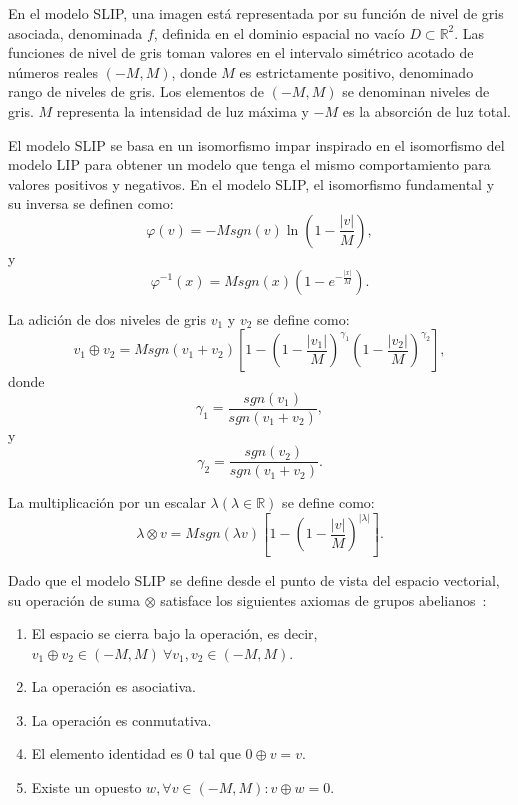 En el modelo SLIP, una imagen está representada por su función de nivel de gris asociada, denominada $f$, definida en el dominio espacial no vacío $D \subset \mathbb{R}^2$. Las funciones de nivel de gris toman valores en el intervalo simétrico acotado de números reales $(-M, M)$, donde $M$ es estrictamente positivo, denominado rango de niveles de gris. Los elementos de $(-M, M )$ se denominan niveles de gris. $M$ representa la intensidad de luz máxima y $-M$ es la absorción de luz total.

El modelo SLIP se basa en un isomorfismo impar inspirado en el isomorfismo del modelo LIP para obtener un modelo que tenga el mismo comportamiento para valores positivos y negativos. En el modelo SLIP, el isomorfismo fundamental y su inversa se definen como:
\begin{equation}
	\varphi(v)=-Msgn(v)\ln\left(1-\frac{|v|}{M}\right),
\end{equation}
y
\begin{equation}
	\varphi^{-1}(x)=Msgn(x)\left(1-e^{-\frac{|x|}{M}}\right).
\end{equation}

La adición de dos niveles de gris $v_1$ y $v_2$ se define como:
\begin{equation}
	v_1\oplus v_2=Msgn(v_1+v_2)\left[1-\left(1-\frac{|v_1|}{M}\right)^{\gamma_1}\left(1-\frac{|v_2|}{M}\right)^{\gamma_2}\right],
\end{equation}
donde
\begin{equation}
	\gamma_1=\frac{sgn(v_1)}{sgn(v_1+v_2)},
\end{equation}
y
\begin{equation}
	\gamma_2=\frac{sgn(v_2)}{sgn(v_1+v_2)}.
\end{equation}

La multiplicación por un escalar $\lambda (\lambda \in \mathbb{R})$ se define como:
\begin{equation}
	\lambda \otimes v = Msgn(\lambda v)\left[1-\left(1-\frac{|v|}{M}\right)^{|\lambda|}\right].
\end{equation}

Dado que el modelo SLIP se define desde el punto de vista del espacio vectorial, su operación de suma $\otimes$ satisface los siguientes axiomas de grupos abelianos~\cite{navarro2013symmetric}:

\begin{enumerate}
	\item El espacio se cierra bajo la operación, es decir, $v_1\oplus v_2 \in (-M, M )~\forall v_1, v_2 \in (-M, M )$.
	\item La operación es asociativa.
	\item La operación es conmutativa.
	\item El elemento identidad es $0$ tal que $0\oplus v = v$.
	\item  Existe un opuesto $w, \forall v \in (-M, M ): v \oplus w = 0$.
\end{enumerate}
  
